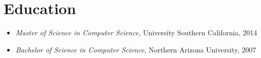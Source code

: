 \documentclass[11pt]{article}
\begin{document}
\section*{Education}
\label{sec-4}

\begin{itemize}
\item \emph{Master of Science in Computer Science}, University Southern California, 2014
\item \emph{Bachelor of Science in Computer Science}, Northern Arizona University, 2007
\end{itemize}
\end{document}
